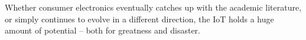 \documentclass[10pt,journal,compsoc]{IEEEtran}
\begin{document}
Whether consumer electronics eventually catches up with the academic
literature, or simply continues to evolve in a different direction, the IoT
holds a huge amount of potential -- both for greatness and disaster.  


%
%
%

{}

\end{document}
